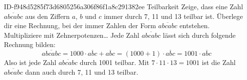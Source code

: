 \begin{exercise}
      {ID-f948d5285f73d6805256a306f86f1a8c291382ee}
      {Teilbarkeit}
  \ifproblem\problem
    Zeige, dass eine Zahl $\overline{abcabc}$ aus den Ziffern $a$, $b$
    und $c$ immer durch 7, 11 und 13 teilbar ist.
  \fi
  \ifoutline\outline
    Überlege dir eine Rechnung, bei der immer Zahlen der
    Form $\overline{abcabc}$ entstehen.
    Multipliziere mit Zehnerpotenzen\ldots
  \fi
  \ifoutcome\outcome
    Jede Zahl $\overline{abcabc}$ lässt sich durch folgende Rechnung bilden:
    \begin{equation*}
      \overline{abcabc}=1000\cdot\overline{abc}+\overline{abc}
      =(1000+1)\cdot\overline{abc}
      =1001\cdot\overline{abc}
    \end{equation*}
    Also ist jede Zahl $\overline{abcabc}$ durch 1001 teilbar.
    Mit $7\cdot11\cdot13=1001$ ist die Zahl $\overline{abcabc}$
    dann auch durch 7, 11 und 13 teilbar.
  \fi
\end{exercise}
